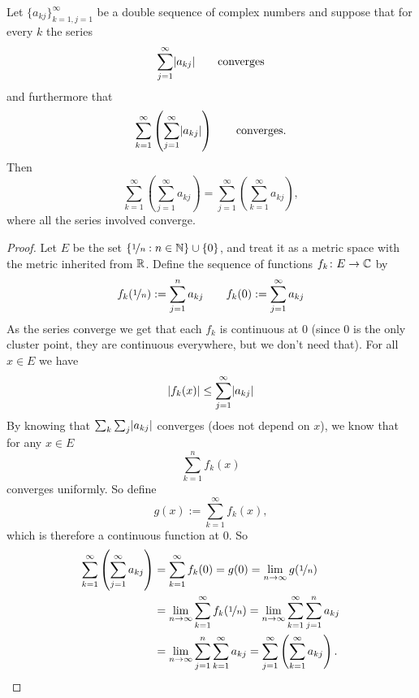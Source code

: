 \begin{thm} \label{thm:fubiniforsums}
Let $\{ a_{kj} \}_{k=1,j=1}^\infty$ be a double
sequence of complex numbers and suppose that for every $k$ the series
\begin{equation*}
\sum_{j=1}^\infty \lvert {a_{kj}} \rvert \qquad \text{converges}
\end{equation*}
and furthermore that
\begin{equation*}
\sum_{k=1}^\infty \left( \sum_{j=1}^\infty \lvert {a_{kj}} \rvert \right)
\qquad \text{converges}.
\end{equation*}
Then
\begin{equation*}
\sum_{k=1}^\infty \left( \sum_{j=1}^\infty a_{kj} \right)
=
\sum_{j=1}^\infty \left( \sum_{k=1}^\infty a_{kj} \right) ,
\end{equation*}
where all the series involved converge.
\end{thm}

\begin{proof}
Let $E$ be the set $\{ \nicefrac{1}{n} : n \in {\mathbb{N}} \} \cup \{ 0 \}$,
and treat it as a metric space with the metric inherited from ${\mathbb{R}}$.
Define the sequence of functions $f_k \colon E \to {\mathbb{C}}$
by
\begin{equation*}
f_k(\nicefrac{1}{n}) := \sum_{j=1}^n a_{kj}
\qquad
f_k(0) := \sum_{j=1}^\infty a_{kj}
\end{equation*}
As the series converge we get that each $f_k$ is continuous at $0$
(since 0 is the only cluster point, they are continuous everywhere, but
we don't need that).
For all $x \in E$ we have
\begin{equation*}
\lvert {f_k(x)} \rvert \leq \sum_{j=1}^\infty \lvert {a_{kj}} \rvert
\end{equation*}
By knowing that $\sum_k \sum_j \lvert {a_{kj}} \rvert$ converges (does not depend on
$x$), we know that for any $x \in E$
\begin{equation*}
\sum_{k=1}^n f_k(x)
\end{equation*}
converges uniformly.  So define
\begin{equation*}
g(x) := \sum_{k=1}^\infty f_k(x) ,
\end{equation*}
which is therefore a continuous function at $0$.
So
\begin{equation*}
\begin{split}
\sum_{k=1}^\infty \left( \sum_{j=1}^\infty a_{kj} \right)
& =
\sum_{k=1}^\infty f_k(0)
= g(0)
= \lim_{n\to\infty} g(\nicefrac{1}{n}) \\
&= 
\lim_{n\to\infty}\sum_{k=1}^\infty f_k(\nicefrac{1}{n})
= 
\lim_{n\to\infty}\sum_{k=1}^\infty \sum_{j=1}^n a_{kj} \\
&= 
\lim_{n\to\infty}\sum_{j=1}^n \sum_{k=1}^\infty a_{kj}
= 
\sum_{j=1}^\infty \left( \sum_{k=1}^\infty a_{kj} \right) . \qedhere
\end{split}
\end{equation*}
\end{proof}

